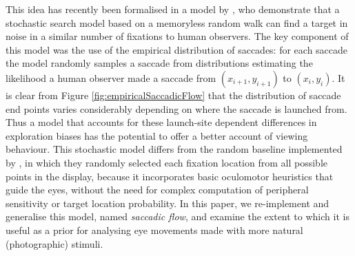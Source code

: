 This idea has recently been formalised in a model by \cite{clarke2015}, who demonstrate that a stochastic search model based on a memoryless random walk can find a target in noise in a similar number of fixations to human observers. The key component of this model was the use of the empirical distribution of saccades: for each saccade the model randomly samples a saccade from distributions estimating the likelihood a human observer made a saccade from $(x_{i+1},y_{i+1})$ to $(x_i,y_i)$. It is clear from Figure \ref{fig:empiricalSaccadicFlow} that the distribution of saccade end points varies considerably depending on where the saccade is launched from. Thus a model that accounts for these launch-site dependent differences in exploration biases has the potential to offer a better account of viewing behaviour. This stochastic model differs from the random baseline implemented by \cite{najemnik-geisler2008}, in which they randomly selected each fixation location from all possible points in the display, because it incorporates basic oculomotor heuristics that guide the eyes, without the need for complex computation of peripheral sensitivity or target location probability. In this paper, we re-implement and generalise this model, named \textit{saccadic flow}, and examine the extent to which it is useful as a prior for analysing eye movements made with more natural (photographic) stimuli. 


